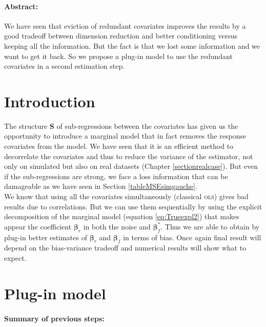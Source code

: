 \documentclass[12pt,a4paper]{report}
\begin{document}
	\paragraph{Abstract:} We have seen that eviction of redundant covariates improves the results by a good tradeoff between dimension reduction and better conditioning versus keeping all the information. But the fact is that we lost some information and we want to get it back. So we propose a plug-in model to use the redundant covariates in a second estimation step.
	\section{Introduction}
		The structure $\boldsymbol{S}$ of sub-regressions between the covariates has given us the opportunity to introduce a marginal model that in fact removes the response covariates from the model. We have seen that it is an efficient method to decorrelate the covariates and thus to reduce the variance of the estimator, not only on simulated but also on real datasets (Chapter \ref{sectionrealcase}). But even if the sub-regressions are strong, we face a loss information that can be damageable as we have seen in Section \ref{tableMSEsimgauche}. \\
		
		We know that using all the covariates simultaneously (classical \textsc{ols}) gives bad results due to correlations. But we can use them sequentially by using the explicit decomposition of the marginal model (equation \ref{eq:Trueexpl2}) that makes appear the coefficient $\boldsymbol{\beta}_r$ in both the noise and $\boldsymbol{\beta}_f^*$. Thus we are able to obtain by plug-in better estimates of $\boldsymbol{\beta}_r$ and $\boldsymbol{\beta}_f$ in terms of bias. Once again final result will depend on the bias-variance tradeoff and numerical results will show what to expect.
	\section{Plug-in model}
	\paragraph{Summary of previous steps:}
	
\end{document}
